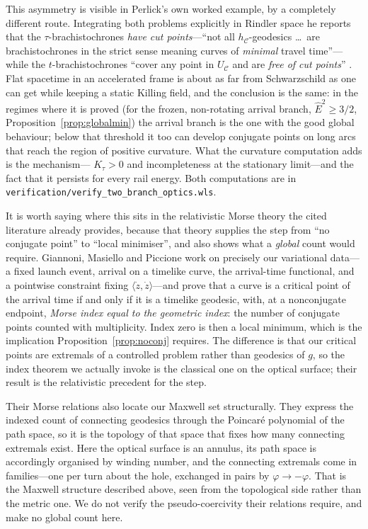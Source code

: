 \documentclass[12pt]{iopart}
\theoremstyle{plain}
\theoremstyle{definition}
\theoremstyle{remark}
\newcommand{\Ehat}{\hat E}
\begin{document}
This asymmetry is visible in Perlick's own worked example, by a completely
different route. Integrating both problems
explicitly in Rindler space he reports that the $\tau$-brachistochrones
\emph{have cut points}---``not all $h_{\mathcal C}$-geodesics \dots\ are
brachistochrones in the strict sense meaning curves of \emph{minimal} travel
time''---while the $t$-brachistochrones ``cover any point in
$U_{\mathcal C}$ and are \emph{free of cut points}''
\cite[\S3, Figs.~5--6]{Perlick1991}. Flat spacetime in an accelerated frame is
about as far from Schwarzschild as one can get while keeping a static Killing
field, and the conclusion is the same: in the regimes where it is proved (for the
frozen, non-rotating arrival branch, $\Ehat^2\ge3/2$, Proposition~\ref{prop:globalmin}) the
arrival branch is the one with the good global behaviour; below that threshold it too can
develop conjugate points on long arcs that reach the region of positive curvature. What the curvature computation adds is the mechanism---%
$K_\tau>0$ and incompleteness at the stationary limit---and the fact that it
persists for every rail energy. Both computations are in
\texttt{verification/verify\_two\_branch\_optics.wls}.

It is worth saying where this sits in the relativistic Morse theory the cited
literature already provides, because that theory supplies the step from ``no
conjugate point'' to ``local minimiser'', and also shows what a \emph{global}
count would require. Giannoni, Masiello and Piccione
\cite{GiannoniMasielloPiccione2000} work on precisely our variational data---a
fixed launch event, arrival on a timelike curve, the arrival-time functional, and
a pointwise constraint fixing $\langle\dot z,\dot z\rangle$---and prove that a
curve is a critical point of the arrival time if and only if it is a timelike
geodesic, with, at a nonconjugate endpoint, \emph{Morse index equal to the
geometric index}: the number of conjugate points counted with multiplicity. Index
zero is then a local minimum, which is the implication
Proposition~\ref{prop:noconj} requires. The difference is that our critical
points are extremals of a controlled problem rather than geodesics of $g$, so the
index theorem we actually invoke is the classical one on the optical surface;
their result is the relativistic precedent for the step.

Their Morse relations also locate our Maxwell set structurally. They express the
indexed count of connecting geodesics through the Poincar\'e polynomial of the
path space, so it is the topology of that space that fixes how many connecting
extremals exist. Here the optical surface is an annulus, its path space is
accordingly organised by winding number, and the connecting extremals come in
families---one per turn about the hole, exchanged in pairs by
$\varphi\to-\varphi$. That is the Maxwell structure described above, seen from
the topological side rather than the metric one. We do not verify the
pseudo-coercivity their relations require, and make no global count here.
\end{document}
